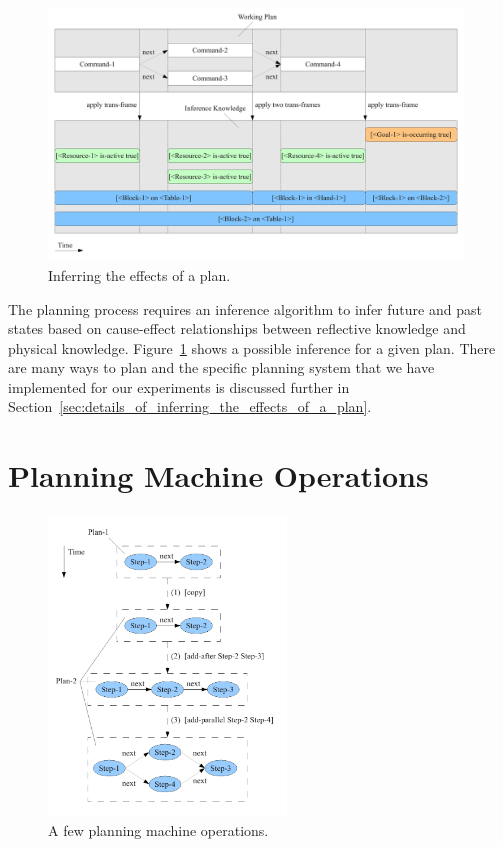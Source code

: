 \begin{figure}[bth]
  \center
  \includegraphics[width=11cm]{gfx/infer_plan_effects}
  \caption[Inferring the effects of a plan.]{Inferring the effects of
    a plan.}
  \label{fig:infer_plan_effects}
\end{figure}

The planning process requires an inference algorithm to infer future
and past states based on cause-effect relationships between reflective
knowledge and physical knowledge.  Figure~\ref{fig:infer_plan_effects}
shows a possible inference for a given plan.  There are many ways to
plan and the specific planning system that we have implemented for our
experiments is discussed further in
Section~\ref{sec:details_of_inferring_the_effects_of_a_plan}.


\section{Planning Machine Operations}

\begin{figure}[bth]
  \center
  \includegraphics[height=8cm]{gfx/planning_machine_operations}
  \caption[A few planning machine operations.]{A few planning machine operations.}
  \label{fig:planning_machine_operations}
\end{figure}


